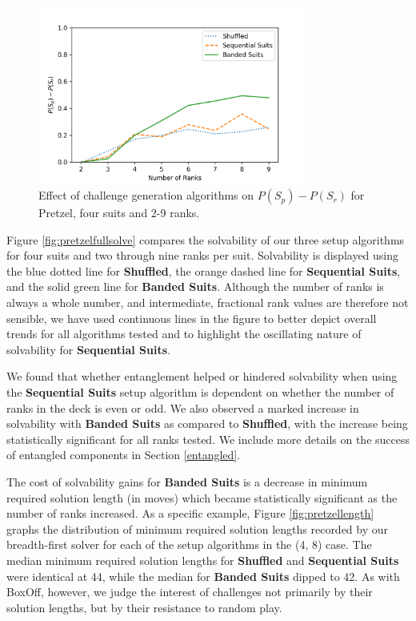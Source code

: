 \documentclass[journal]{IEEEtran}
\begin{document}
\begin{figure}[t]
\includegraphics[width=8.8cm]{figure11.png}
\caption{Effect of challenge generation algorithms on $P(S_p) - P(S_r)$ for Pretzel, four suits and 2-9 ranks.}
\label{fig:pretzelinterest}
\end{figure}

Figure \ref{fig:pretzelfullsolve} compares the solvability of our three setup algorithms for four suits and two through nine ranks per suit. Solvability is displayed using the blue dotted line for \textbf{Shuffled}, the orange dashed line for \textbf{Sequential Suits}, and the solid green line for \textbf{Banded Suits}. Although the number of ranks is always a whole number, and intermediate, fractional rank values are therefore not sensible, we have used continuous lines in the figure to better depict overall trends for all algorithms tested and to highlight the oscillating nature of solvability for \textbf{Sequential Suits}.

We found that whether entanglement helped or hindered solvability when using the \textbf{Sequential Suits} setup algorithm is dependent on whether the number of ranks in the deck is even or odd. We also observed a marked increase in solvability with \textbf{Banded Suits} as compared to \textbf{Shuffled}, with the increase being statistically significant for all ranks tested. We include more details on the success of entangled components in Section \ref{entangled}.

The cost of solvability gains for \textbf{Banded Suits} is a decrease in minimum required solution length (in moves) which became statistically significant as the number of ranks increased. As a specific example, Figure \ref{fig:pretzellength} graphs the distribution of minimum required solution lengths recorded by our breadth-first solver for each of the setup algorithms in the (4, 8) case. The median minimum required solution lengths for \textbf{Shuffled} and \textbf{Sequential Suits} were identical at 44, while the median for \textbf{Banded Suits} dipped to 42. As with BoxOff, however, we judge the interest of challenges not primarily by their solution lengths, but by their resistance to random play.
\end{document}
